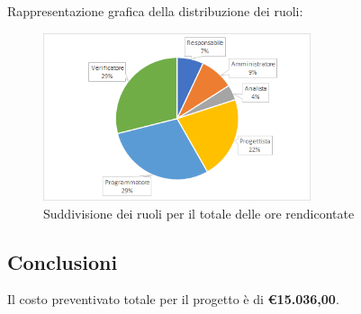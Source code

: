 			Rappresentazione grafica della distribuzione dei ruoli:
			\begin{figure}[h]
				\centering
				\includegraphics[width=0.7\textwidth]{./res/img/totaleRendicontate_pe.png}
				\caption{Suddivisione dei ruoli per il totale delle ore rendicontate}
			\end{figure}

\subsection{Conclusioni}
		Il costo preventivato totale per il progetto è di \textbf{\euro15.036,00}.
